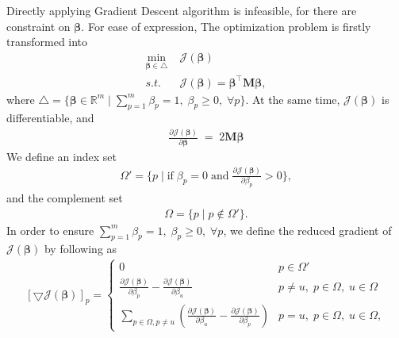\documentclass{article}
\begin{document}
Directly applying Gradient Descent algorithm is infeasible, for there are constraint on $\boldsymbol{\beta}$.
For ease of expression, The optimization problem is firstly transformed into 
\begin{equation}\label{eq:obj_tran_two}
	\begin{split}
		\min_{\boldsymbol{\beta}\in \bigtriangleup} &\; \mathcal{J}(\boldsymbol{\beta}) \\
		s.t. & \; \mathcal{J}(\boldsymbol{\beta}) = \boldsymbol{\beta}^\top\mathbf{M}\boldsymbol{\beta},
	\end{split}
\end{equation}
where $\bigtriangleup = \{ \boldsymbol{\beta} \in \mathbb{R}^m\; |\; \sum_{p=1}^m \beta_p = 1,\; \beta_p\geq 0,\; \forall p\}$.
At the same time, $\mathcal{J}(\boldsymbol{\beta})$ is differentiable, and
\begin{equation}\label{eq:obj_derivative_two}
	\begin{split}
		\frac{\partial \mathcal{J}(\boldsymbol{\beta})}{\partial \boldsymbol{\beta}}\; =\; 2\mathbf{M}\boldsymbol{\beta}
	\end{split}
\end{equation}
We define an index set
\begin{equation}
	\begin{split}
		\Omega' = \{p\; |\; \mathrm{if}\; \beta_p=0\; \mathrm{and}\; \frac{\partial \mathcal{J}(\boldsymbol{\beta})}{\partial \beta_p} > 0\},
	\end{split}
\end{equation}
and the complement set 
\begin{equation}
	\begin{split}
		\Omega = \{p\; |\; p \notin \Omega'\}.
	\end{split}
\end{equation}
In order to ensure $\sum_{p=1}^m \beta_p = 1,\;\beta_p \geq 0,\; \forall p$, we define the reduced gradient of $\mathcal{J}(\boldsymbol{\beta})$ by following \cite{rakotomamonjy2008simplemkl} as 
\begin{equation}\label{eq:gradient}
	\begin{split}
		[\bigtriangledown \mathcal{J}(\boldsymbol{\beta})]_p = \left\{
			\begin{array}{ll}
			0	&	p\in \Omega' \\
			\frac{\partial \mathcal{J}(\boldsymbol{\beta})}{\partial \beta_p} - \frac{\partial \mathcal{J}(\boldsymbol{\beta})}{\partial \beta_u}  &  p\neq u,\; p\in \Omega,\; u\in \Omega\\
			\sum_{p\in \Omega,p\neq u} (\frac{\partial \mathcal{J}(\boldsymbol{\beta})}{\partial \beta_u} - \frac{\partial \mathcal{J}(\boldsymbol{\beta})}{\partial \beta_p}) & p=u, \; p\in \Omega,\; u\in \Omega,
			\end{array} \right.
	\end{split}
\end{equation}
\end{document}
